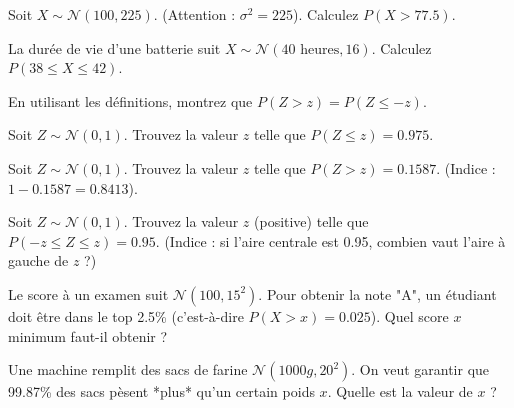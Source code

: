 \begin{exercicebox}
Soit $X \sim \mathcal{N}(100, 225)$. (Attention : $\sigma^2=225$).
Calculez $P(X > 77.5)$.
\end{exercicebox}

\begin{exercicebox}
La durée de vie d'une batterie suit $X \sim \mathcal{N}(40 \text{ heures}, 16)$.
Calculez $P(38 \le X \le 42)$.
\end{exercicebox}

\begin{exercicebox}
En utilisant les définitions, montrez que $P(Z > z) = P(Z \le -z)$.
\end{exercicebox}


\begin{exercicebox}
Soit $Z \sim \mathcal{N}(0, 1)$. Trouvez la valeur $z$ telle que $P(Z \le z) = 0.975$.
\end{exercicebox}

\begin{exercicebox}
Soit $Z \sim \mathcal{N}(0, 1)$. Trouvez la valeur $z$ telle que $P(Z > z) = 0.1587$.
(Indice : $1 - 0.1587 = 0.8413$).
\end{exercicebox}

\begin{exercicebox}
Soit $Z \sim \mathcal{N}(0, 1)$. Trouvez la valeur $z$ (positive) telle que $P(-z \le Z \le z) = 0.95$.
(Indice : si l'aire centrale est 0.95, combien vaut l'aire à gauche de $z$ ?)
\end{exercicebox}

\begin{exercicebox}
Le score à un examen suit $\mathcal{N}(100, 15^2)$. Pour obtenir la note "A", un étudiant doit être dans le top 2.5\% (c'est-à-dire $P(X > x) = 0.025$).
Quel score $x$ minimum faut-il obtenir ?
\end{exercicebox}

\begin{exercicebox}
Une machine remplit des sacs de farine $\mathcal{N}(1000g, 20^2)$. On veut garantir que 99.87\% des sacs pèsent *plus* qu'un certain poids $x$.
Quelle est la valeur de $x$ ?
\end{exercicebox}

